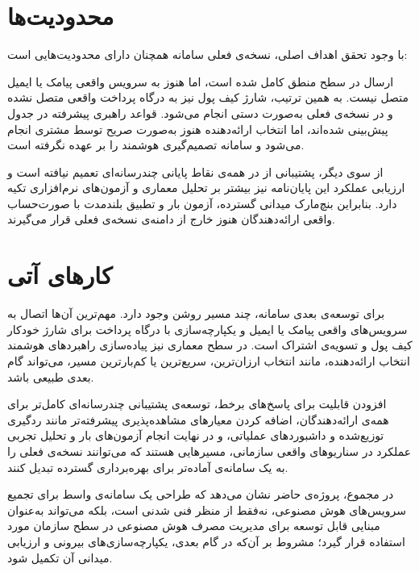 \section{محدودیت‌ها}

با وجود تحقق اهداف اصلی، نسخه‌ی فعلی سامانه همچنان دارای محدودیت‌هایی است:

ارسال  در سطح منطق کامل شده است، اما هنوز به سرویس واقعی پیامک یا
ایمیل متصل نیست. به همین ترتیب، شارژ کیف پول نیز به درگاه پرداخت واقعی
متصل نشده و در نسخه‌ی فعلی به‌صورت دستی انجام می‌شود. قواعد راهبری
پیشرفته در جدول  پیش‌بینی شده‌اند، اما انتخاب
ارائه‌دهنده هنوز به‌صورت صریح توسط مشتری انجام می‌شود و سامانه تصمیم‌گیری
هوشمند را بر عهده نگرفته است.

از سوی دیگر، پشتیبانی از  در همه‌ی نقاط پایانی چندرسانه‌ای
تعمیم نیافته است و ارزیابی عملکرد این پایان‌نامه نیز بیشتر بر تحلیل
معماری و آزمون‌های نرم‌افزاری تکیه دارد. بنابراین بنچ‌مارک میدانی
گسترده، آزمون بار و تطبیق بلندمدت با صورت‌حساب واقعی ارائه‌دهندگان هنوز
خارج از دامنه‌ی نسخه‌ی فعلی قرار می‌گیرند.

\section{کارهای آتی}

برای توسعه‌ی بعدی سامانه، چند مسیر روشن وجود دارد. مهم‌ترین آن‌ها اتصال
 به سرویس‌های واقعی پیامک یا ایمیل و یکپارچه‌سازی با درگاه پرداخت
برای شارژ خودکار کیف پول و تسویه‌ی اشتراک است. در سطح معماری نیز
پیاده‌سازی راهبردهای هوشمند انتخاب ارائه‌دهنده، مانند انتخاب
ارزان‌ترین، سریع‌ترین یا کم‌بارترین مسیر، می‌تواند گام بعدی طبیعی باشد.

افزودن قابلیت  برای پاسخ‌های برخط، توسعه‌ی پشتیبانی
چندرسانه‌ای کامل‌تر برای همه‌ی ارائه‌دهندگان، اضافه کردن معیارهای
مشاهده‌پذیری پیشرفته‌تر مانند ردگیری توزیع‌شده و داشبوردهای عملیاتی، و
در نهایت انجام آزمون‌های بار و تحلیل تجربی عملکرد در سناریوهای واقعی
سازمانی، مسیرهایی هستند که می‌توانند نسخه‌ی فعلی را به یک سامانه‌ی
آماده‌تر برای بهره‌برداری گسترده تبدیل کنند.

در مجموع، پروژه‌ی حاضر نشان می‌دهد که طراحی یک سامانه‌ی واسط برای
تجمیع سرویس‌های هوش مصنوعی، نه‌فقط از منظر فنی شدنی است، بلکه می‌تواند
به‌عنوان مبنایی قابل توسعه برای مدیریت مصرف هوش مصنوعی در سطح سازمان
مورد استفاده قرار گیرد؛ مشروط بر آن‌که در گام بعدی، یکپارچه‌سازی‌های
بیرونی و ارزیابی میدانی آن تکمیل شود.
